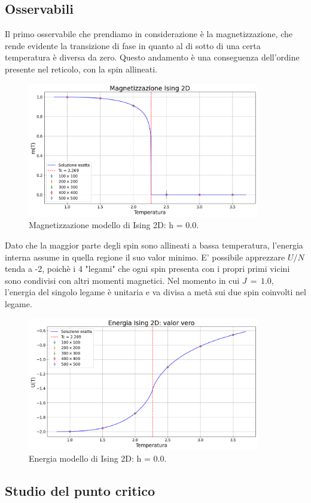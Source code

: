 \subsection{Osservabili}

Il primo osservabile che prendiamo in considerazione è la magnetizzazione, che rende evidente la transizione di fase in quanto al di 
sotto di una certa temperatura è diversa da zero. Questo andamento è una conseguenza dell'ordine presente nel reticolo, con la spin allineati. 

\begin{figure}[H]
    \centering
    \includegraphics[width=0.9\textwidth]{Immagini/simIsing2D/magn.png}
    \caption{Magnetizzazione modello di Ising 2D: h = 0.0.}
    \label{fig: magn_Ising2D}
\end{figure}

Dato che la maggior parte degli spin sono allineati a bassa temperatura, l'energia interna assume in quella regione il suo valor minimo. 
E' possibile apprezzare $U/N$ tenda a -2, poichè i 4 "legami" che ogni spin presenta con i propri primi vicini sono condivisi con altri 
momenti magnetici. Nel momento in cui $J\,=\,1.0$, l'energia del singolo legame è unitaria e va divisa a metà sui due spin coinvolti nel 
legame.

\begin{figure}[H]
    \centering
    \includegraphics[width=0.9\textwidth]{Immagini/simIsing2D/ene.png}
    \caption{Energia modello di Ising 2D: h = 0.0.}
    \label{fig: ene_Ising2D}
\end{figure}


\subsection{Studio del punto critico}

\newpage
